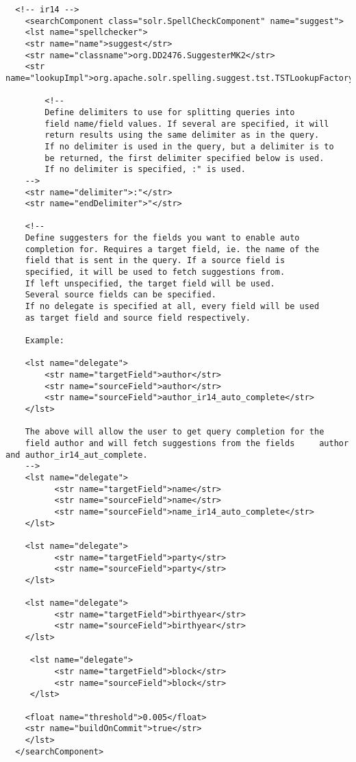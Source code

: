 \begin{verbatim}
  <!-- ir14 -->
    <searchComponent class="solr.SpellCheckComponent" name="suggest">
    <lst name="spellchecker">
    <str name="name">suggest</str>
    <str name="classname">org.DD2476.SuggesterMK2</str>
    <str name="lookupImpl">org.apache.solr.spelling.suggest.tst.TSTLookupFactory</str>

        <!--
        Define delimiters to use for splitting queries into
        field name/field values. If several are specified, it will
        return results using the same delimiter as in the query.
        If no delimiter is used in the query, but a delimiter is to
        be returned, the first delimiter specified below is used.
        If no delimiter is specified, :" is used.
    -->
    <str name="delimiter">:"</str>
    <str name="endDelimiter">"</str>

    <!--
    Define suggesters for the fields you want to enable auto
    completion for. Requires a target field, ie. the name of the
    field that is sent in the query. If a source field is
    specified, it will be used to fetch suggestions from.
    If left unspecified, the target field will be used.
    Several source fields can be specified.
    If no delegate is specified at all, every field will be used
    as target field and source field respectively.

    Example:

    <lst name="delegate">
        <str name="targetField">author</str>
        <str name="sourceField">author</str>
        <str name="sourceField">author_ir14_auto_complete</str>
    </lst>

    The above will allow the user to get query completion for the 
    field author and will fetch suggestions from the fields     author and author_ir14_aut_complete.
    -->
    <lst name="delegate">
          <str name="targetField">name</str>
          <str name="sourceField">name</str>
          <str name="sourceField">name_ir14_auto_complete</str>
    </lst>

    <lst name="delegate">
          <str name="targetField">party</str>
          <str name="sourceField">party</str>
    </lst>

    <lst name="delegate">
          <str name="targetField">birthyear</str>
          <str name="sourceField">birthyear</str>
    </lst>

     <lst name="delegate">
          <str name="targetField">block</str>
          <str name="sourceField">block</str>
     </lst>
     
    <float name="threshold">0.005</float>
    <str name="buildOnCommit">true</str>
    </lst>
  </searchComponent>
\end{verbatim}


